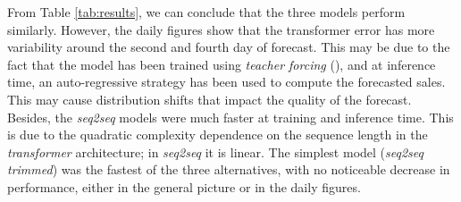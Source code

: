 From Table \ref{tab:results}, we can conclude that the three models perform similarly. However, the daily figures show that the transformer error has more variability around the second and fourth day of forecast. This may be due to the fact that the model has been trained using \textit{teacher forcing} (\cite{williams1989, goyal2016}), and at inference time, an auto-regressive strategy has been used to compute the forecasted sales. This may cause distribution shifts that impact the quality of the forecast.  Besides, the \textit{seq2seq} models were much faster at training and inference time. This is due to the quadratic complexity dependence on the sequence length in the \textit{transformer} architecture; in \textit{seq2seq} it is linear. The simplest model (\textit{seq2seq trimmed}) was the fastest of the three alternatives, with no noticeable decrease in performance, either in the general picture or in the daily figures.

